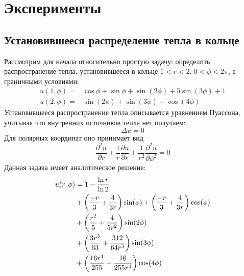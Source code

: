 \documentclass[a4paper,14pt]{extarticle} %
\begin{document}

\newpage
\section{Эксперименты}

\subsection{Установившееся распределение тепла в кольце}

Рассмотрим для начала относительно простую задачу: определить распространение тепла, установившееся в кольце $1<r<2.\; 0<\phi<2\pi$, с граничными условиями:
\begin{equation}
    \begin{aligned}
        u(1,\phi)=&\cos\phi+\sin\phi+\sin(2\phi)+5\sin(3\phi)+1\\
        u(2,\phi)=&\sin(2\phi)+\sin(3\phi)+\cos(4\phi)
    \end{aligned}
\end{equation}
Установившееся распространение тепла описывается уравнением Пуассона, учитывая что внутренних источников тепла нет получаем:
\begin{equation}
    \Delta u = 0
\end{equation}
Для полярных координат оно принимает вид
\begin{equation}
    \frac{\partial^2 u}{\partial r} + \frac{1}{r} \frac{\partial u}{\partial r} + \frac{1}{r^2}\frac{\partial^2 u}{\partial \phi^2} = 0
\end{equation}
Данная задача имеет аналитическое решение:
\begin{equation}\label{eq:termal}
    \begin{split}
        u(r,\phi) & = 1-\frac{\ln r}{\ln 2}\\
        &+{\left( \frac{-r}{3}+\frac{4}{3r} \right)}\sin(\phi)+{\left( \frac{-r}{3}+\frac{4}{3r} \right)}\cos(\phi)\\
        &+{\left( \frac{r^2}{5}+\frac{4}{5r^2} \right)}\sin(2\phi)\\
        &+{\left( \frac{3r^3}{63}+\frac{312}{64r^3} \right)}\sin(3\phi)\\
        &+{\left( \frac{16r^4}{255}-\frac{16}{255r^4} \right)}\cos(4\phi)
    \end{split}
\end{equation}
\end{document}
